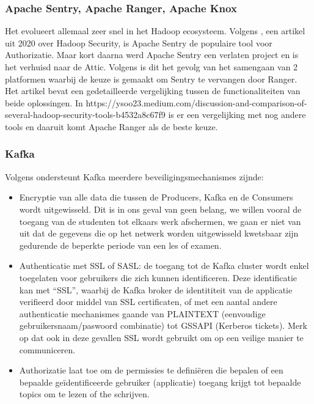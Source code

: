 \subsubsection{Apache Sentry, Apache Ranger, Apache Knox}
Het evolueert allemaal zeer snel in het Hadoop ecosysteem. Volgens \textcite{Chu2020}, een artikel uit 2020 over Hadoop Security, is Apache Sentry de populaire tool voor Authorizatie. Maar kort daarna werd Apache Sentry een verlaten project en is het verhuisd naar de Attic.
\newline
Volgens \textcite{Anand2021} is dit het gevolg van het samengaan van 2 platformen waarbij de keuze is gemaakt om Sentry te vervangen door Ranger. Het artikel bevat een gedetailleerde vergelijking tussen de functionaliteiten van beide oplossingen.
\newline
In https://ysoo23.medium.com/discussion-and-comparison-of-several-hadoop-security-tools-b4532a8c67f9 is er een vergelijking met nog andere tools en daaruit komt Apache Ranger als de beste keuze.


\subsubsection {Kafka}
Volgens \textcite{Maarek2018} ondersteunt Kafka meerdere beveiligingsmechanismes zijnde:
\begin{itemize}
    \item Encryptie van alle data die tussen de Producers, Kafka en de Consumers wordt uitgewisseld. Dit is in ons geval van geen belang, we willen vooral de toegang van de studenten tot elkaars werk afschermen, we gaan er niet van uit dat de gegevens die op het netwerk worden uitgewisseld kwetsbaar zijn gedurende de beperkte periode van een les of examen.
    \item Authenticatie met SSL of SASL: de toegang tot de Kafka cluster wordt enkel toegelaten voor gebruikers die zich kunnen identificeren. Deze identificatie kan met ``SSL'', waarbij de Kafka broker de identititeit van de applicatie verifieerd door middel van SSL certificaten, of met een aantal andere authenticatie mechanismes gaande van PLAINTEXT (eenvoudige gebruikersnaam/paswoord combinatie) tot GSSAPI (Kerberos tickets). Merk op dat ook in deze gevallen SSL wordt gebruikt om op een veilige manier te communiceren.
    \item Authorizatie laat toe om de permissies te definiëren die bepalen of een bepaalde geïdentificeerde gebruiker (applicatie) toegang krijgt tot bepaalde topics om te lezen of the schrijven.
\end{itemize}


